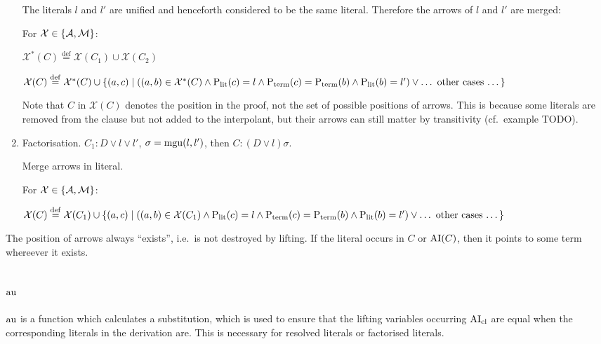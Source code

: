\documentclass[,%
	paper=a4,%
	DIV14, %
	twoside=false,%
	liststotoc,
	bibtotoc,
	draft=false,%
	numbers=noendperiod
]{scrartcl}
\begin{document}
\begin{enumerate}
		The literals $l$ and $l'$ are unified and henceforth considered to be the same literal.
		Therefore the arrows of $l$ and $l'$ are merged:

		For $\mathcal{X} \in \{\operatorname{\mathcal{A}}, \operatorname{\operatorname{\mathcal{M}}}\}$:

		$\mathcal{X}^*(C) \stackrel{\operatorname{def}}{=} \mathcal{X}(C_1) \cup \mathcal{X}(C_2)$

		$\mathcal{X}(C) \stackrel{\operatorname{def}}{=} \mathcal{X}^*(C) \cup \{(a,c) \mid ((a,b)\in\mathcal{X}^*(C) \land \operatorname{\operatorname{{\operatorname P}}_\mathrm{lit}}(c) = l \land \operatorname{\operatorname{{\operatorname P}}_\mathrm{term}}(c) = \operatorname{\operatorname{{\operatorname P}}_\mathrm{term}}(b) \land \operatorname{\operatorname{{\operatorname P}}_\mathrm{lit}}(b) = l') \lor \text{\dots~other cases \dots}\}$

		Note that $C$ in $\mathcal{X}(C)$ denotes the position in the proof, not the set of possible positions of arrows.
		This is because some literals are removed from the clause but not added to the interpolant, but their arrows can still matter by transitivity (cf.~example TODO).

	\item Factorisation. $C_1: D \lor l \lor l'$, $\sigma = \operatorname{mgu}(l, l')$, then $C: (D\lor l)\sigma$.

		Merge arrows in literal.

		For $\mathcal{X} \in \{\operatorname{\mathcal{A}}, \operatorname{\operatorname{\mathcal{M}}}\}$:

		$\mathcal{X}(C) \stackrel{\operatorname{def}}{=} \mathcal{X}(C_1) \cup \{(a,c) \mid ((a,b)\in\mathcal{X}(C_1) \land \operatorname{\operatorname{{\operatorname P}}_\mathrm{lit}}(c) = l \land \operatorname{\operatorname{{\operatorname P}}_\mathrm{term}}(c) = \operatorname{\operatorname{{\operatorname P}}_\mathrm{term}}(b) \land \operatorname{\operatorname{{\operatorname P}}_\mathrm{lit}}(b) = l') \lor \text{\dots~other cases \dots}\}$


\end{enumerate}

\begin{conj}
	The position of arrows always ``exists'', i.e.~is not destroyed by lifting. If the literal occurs in $C$ or $\operatorname{AI}(C)$, then it points to some term whereever it exists.
\end{conj}

\subsection{$\operatorname{au}$}

$\operatorname{au}$ is a function which calculates a substitution, which is used to ensure that the lifting variables occurring $\operatorname{AI}_\mathrm{cl}$ are equal when the corresponding literals in the derivation are. This is necessary for resolved literals or factorised literals.
\end{document}
